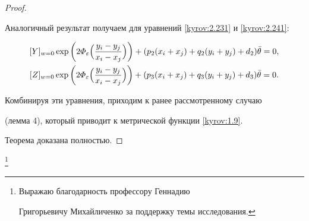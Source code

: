 \begin{proof}
$$

Аналогичный результат получаем для уравнений \eqref{kyrov:2.231} и \eqref{kyrov:2.241}:

\begin{gather*}

[Y]_{w=0}\exp\left({2\varPhi_{\varepsilon}\Bigl(\frac{y_i-y_j}{x_i-x_j}\Bigr)}\right) + (p_2(x_i+x_j) + q_2(y_i+y_j) + d_2)\bar{\theta} = 0,\\

[Z]_{w=0}\exp\left({2\varPhi_{\varepsilon}\Bigl(\frac{y_i-y_j}{x_i-x_j}\Bigr)}\right) + (p_3(x_i+x_j) + q_3(y_i+y_j) + d_3)\bar{\theta} = 0.

\end{gather*}

Комбинируя эти уравнения, приходим к ранее рассмотренному случаю

(лемма 4), который приводит к метрической функции \eqref{kyrov:1.9}.

Теорема доказана полностью.

\end{proof}



\thanks{Выражаю благодарность профессору  Геннадию

Григорьевичу  Михайличенко за поддержку темы исследования.}





